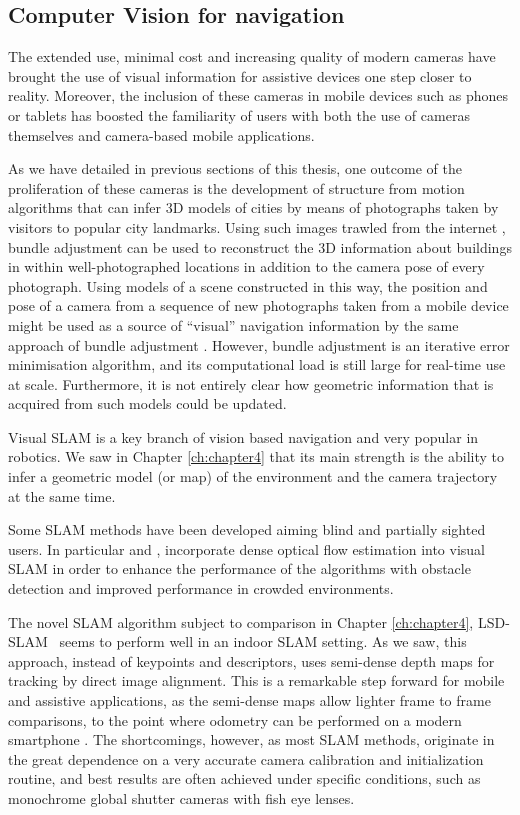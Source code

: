 \subsection{Computer Vision for navigation}

The extended use, minimal cost and increasing quality of modern cameras have brought the use of visual information for assistive devices one step closer to reality. Moreover, the inclusion of these cameras in mobile devices such as phones or tablets has boosted the familiarity of users with both the use of cameras themselves and camera-based mobile applications.

As we have detailed in previous sections of this thesis, one outcome of the proliferation of these cameras is the development of structure from motion algorithms that can infer 3D models of cities \citep{agarwal2011building} by means of photographs taken by visitors to popular city landmarks. Using such images trawled from the internet \citep{snavely2006photo}, bundle adjustment can be used to reconstruct the 3D information about buildings in within well-photographed locations in addition to the camera pose of every photograph. Using models of a scene constructed in this way, the position and pose of a camera from a sequence of new photographs taken from a mobile device might be used as a source of ``visual'' navigation information by the same approach of bundle adjustment \citep{ventura2014global}.  However, bundle adjustment is an iterative error minimisation algorithm, and its computational load is still large for real-time use at scale.  Furthermore, it is not entirely clear how geometric information that is acquired from such models could be updated.

Visual SLAM is a key branch of vision based navigation and very popular in robotics. We saw in Chapter \ref{ch:chapter4} that its main strength is the ability to infer a geometric model (or map) of the environment and the camera trajectory at the same time. 

Some SLAM methods have been developed aiming blind and partially sighted users. In particular \cite{alcantarilla2010visual} and \cite{alcantarilla2012combining}, incorporate dense optical flow estimation into visual SLAM in order to enhance the performance of the algorithms with obstacle detection and improved performance in crowded environments. 

The novel SLAM algorithm subject to comparison in Chapter \ref{ch:chapter4}, LSD-SLAM~\citep{engel14eccv} seems to perform well in an indoor SLAM setting. As we saw, this approach, instead of keypoints and descriptors, uses semi-dense depth maps for tracking by direct image alignment. This is a remarkable step forward for mobile and assistive applications, as the semi-dense maps allow lighter frame to frame comparisons, to the point where odometry can be performed on a modern smartphone \citep{schoeps14ismar}. The shortcomings, however, as most SLAM methods, originate in the great dependence on a very accurate camera calibration and initialization routine, and best results are often achieved under specific conditions, such as monochrome global shutter cameras with fish eye lenses.

